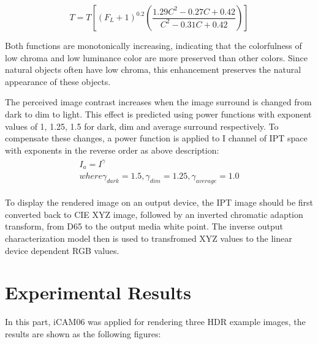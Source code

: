 \documentclass[10pt,twocolumn,letterpaper]{article}
\begin{document}
\begin{equation}
	T=T[(F_L+1)^{0.2}(\frac{1.29C^2-0.27C+0.42}{C^2-0.31C+0.42})]
\end{equation}

Both functions are monotonically increasing, indicating that the colorfulness of low chroma and low luminance color are more preserved than other colors. Since natural objects often have low chroma, this enhancement preserves the natural appearance of these objects.

The perceived image contrast increases when the image surround is changed from dark to dim to light. This effect is predicted using power functions with exponent values of 1, 1.25, 1.5 for dark, dim and average surround respectively\cite{hunt1967reproduction}. To compensate these changes, a power function is applied to I channel of IPT space with exponents in the reverse order as above description:
\begin{align}
\begin{aligned}
	I_a = I^{\gamma}\\
	where \gamma_{dark} = 1.5, \gamma_{dim} = 1.25, \gamma_{average} = 1.0
\end{aligned}
\end{align}

To display the rendered image on an output device, the IPT image should be first converted back to CIE XYZ image, followed by an inverted chromatic adaption transform, from D65 to the output media white point. The inverse output characterization model then is used to transfromed XYZ values to the linear device dependent RGB values.

\section{Experimental Results}
In this part, iCAM06 was applied for rendering three HDR example images, the results are shown as the following figures:
\end{document}
